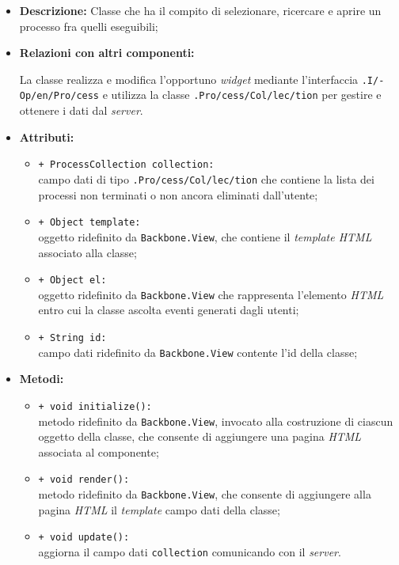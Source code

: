 \begin{flushleft}
\begin{itemize}
\item \textbf{Descrizione:} Classe che ha il compito di selezionare, ricercare e aprire un processo fra quelli eseguibili;
\item \textbf{Relazioni con altri componenti:}
\begin{sloppypar}
La classe realizza e modifica l'opportuno \textit{widget} mediante l'interfaccia \texttt{\viewUser{}.I\fshyp{}Op\fshyp{}en\fshyp{}Pro\fshyp{}cess} e utilizza la classe \texttt{\collection{}.Pro\fshyp{}cess\fshyp{}Col\fshyp{}lec\fshyp{}tion} per gestire e ottenere i dati dal \textit{server}.
\end{sloppypar}
\item \textbf{Attributi:}
\begin{sloppypar}
\begin{itemize}
\item \texttt{+ ProcessCollection collection:}\\ campo dati di tipo \texttt{\collection{}.Pro\fshyp{}cess\fshyp{}Col\fshyp{}lec\fshyp{}tion} che contiene la lista dei processi non terminati o non ancora eliminati dall'utente;
\item \texttt{+ Object template:}\\ oggetto ridefinito da \texttt{Backbone.View}, che contiene il \textit{template HTML} associato alla classe;
\item \texttt{+ Object el:}\\ oggetto ridefinito da \texttt{Backbone.View} che rappresenta l'elemento \textit{HTML} entro cui la classe ascolta eventi generati dagli utenti;
\item \texttt{+ String id:}\\ campo dati ridefinito da \texttt{Backbone.View} contente l'id della classe;
\end{itemize}
\end{sloppypar}
\item \textbf{Metodi:}
\begin{sloppypar}
\begin{itemize}
\item \texttt{+ void initialize():}\\ metodo ridefinito da \texttt{Backbone.View}, invocato alla costruzione di ciascun oggetto della classe, che consente di aggiungere una pagina \textit{HTML} associata al componente;
\item \texttt{+ void render():}\\ metodo ridefinito da \texttt{Backbone.View}, che consente di aggiungere alla pagina \textit{HTML} il \textit{template} campo dati della classe;
\item \texttt{+ void update():}\\ aggiorna il campo dati \texttt{collection} comunicando con il \textit{server}.
\end{itemize}
\end{sloppypar}
\end{itemize}
\end{flushleft}

